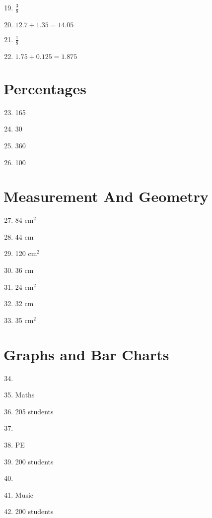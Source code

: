 \documentclass[10pt,a4paper]{article}
\begin{document}
\begin{enumerate}
\setcounter{enumi}{18}
\item $\frac{3}{8}$
\item $12.7 + 1.35 = 14.05$
\item $\frac{1}{8}$
\item $1.75 + 0.125 = 1.875$
\end{enumerate}

\section*{Percentages}

\begin{enumerate}
\setcounter{enumi}{22}
\item 165
\item 30
\item 360
\item 100
\end{enumerate}

\section*{Measurement And Geometry}

\begin{enumerate}
\setcounter{enumi}{26}
\item 84 $\text{cm}^{2}$
\item 44 cm
\item 120 $\text{cm}^{2}$
\item 36 cm
\item 24 $\text{cm}^{2}$
\item 32 cm
\item 35 $\text{cm}^{2}$
\end{enumerate}

\section*{Graphs and Bar Charts}

\begin{enumerate}
\setcounter{enumi}{33}
\item 
\item Maths
\item 205 students
\item 
\item PE
\item 200 students
\item 
\item Music
\item 200 students
\end{enumerate}
\end{document}

